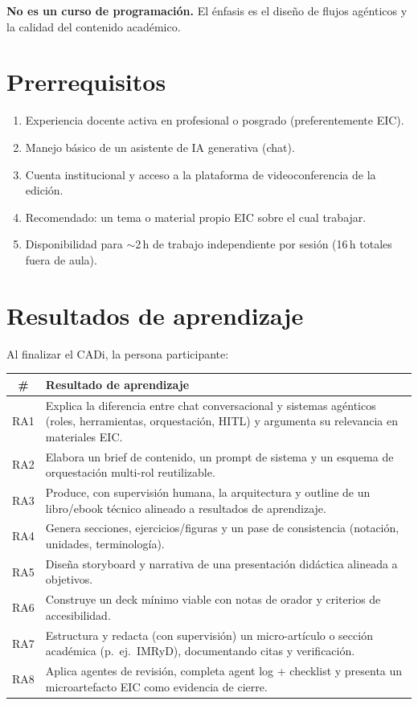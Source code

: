 \textbf{No es un curso de programación.} El énfasis es el diseño de flujos agénticos y la calidad del contenido académico.

\section{Prerrequisitos}

\begin{enumerate}
\item Experiencia docente activa en profesional o posgrado (preferentemente EIC).
\item Manejo básico de un asistente de IA generativa (chat).
\item Cuenta institucional y acceso a la plataforma de videoconferencia de la edición.
\item Recomendado: un tema o material propio EIC sobre el cual trabajar.
\item Disponibilidad para $\sim$2\,h de trabajo independiente por sesión (16\,h totales fuera de aula).
\end{enumerate}

\section{Resultados de aprendizaje}

Al finalizar el CADi, la persona participante:

\begin{tabularx}{\textwidth}{@{}cX@{}}
\toprule
\# & Resultado de aprendizaje \\
\midrule
RA1 & Explica la diferencia entre chat conversacional y sistemas agénticos (roles, herramientas, orquestación, HITL) y argumenta su relevancia en materiales EIC. \\
RA2 & Elabora un brief de contenido, un prompt de sistema y un esquema de orquestación multi-rol reutilizable. \\
RA3 & Produce, con supervisión humana, la arquitectura y outline de un libro/ebook técnico alineado a resultados de aprendizaje. \\
RA4 & Genera secciones, ejercicios/figuras y un pase de consistencia (notación, unidades, terminología). \\
RA5 & Diseña storyboard y narrativa de una presentación didáctica alineada a objetivos. \\
RA6 & Construye un deck mínimo viable con notas de orador y criterios de accesibilidad. \\
RA7 & Estructura y redacta (con supervisión) un micro-artículo o sección académica (p.\ ej.\ IMRyD), documentando citas y verificación. \\
RA8 & Aplica agentes de revisión, completa agent log + checklist y presenta un microartefacto EIC como evidencia de cierre. \\
\bottomrule
\end{tabularx}

